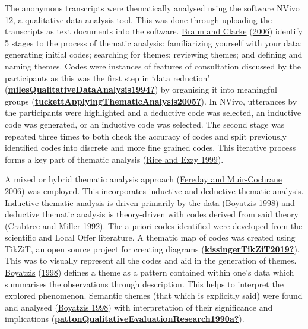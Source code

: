 \documentclass[
]{article}
\begin{document}
The anonymous transcripts were thematically analysed using the software
NVivo 12, a qualitative data analysis tool. This was done through
uploading the transcripts as text documents into the software.
\protect\hyperlink{ref-braunUsingThematicAnalysis2006}{Braun and Clarke}
(\protect\hyperlink{ref-braunUsingThematicAnalysis2006}{2006}) identify
5 stages to the process of thematic analysis: familiarizing yourself
with your data; generating initial codes; searching for themes;
reviewing themes; and defining and naming themes. Codes were instances
of features of consultation discussed by the participants as this was
the first step in `data reduction'
(\protect\hyperlink{ref-milesQualitativeDataAnalysis1994}{\textbf{milesQualitativeDataAnalysis1994?}})
by organising it into meaningful groups
(\protect\hyperlink{ref-tuckettApplyingThematicAnalysis2005}{\textbf{tuckettApplyingThematicAnalysis2005?}}).
In NVivo, utterances by the participants were highlighted and a
deductive code was selected, an inductive code was generated, or an
inductive code was selected. The second stage was repeated three times
to both check the accuracy of codes and split previously identified
codes into discrete and more fine grained codes. This iterative process
forms a key part of thematic analysis
(\protect\hyperlink{ref-riceQualitativeResearchMethods1999}{Rice and
Ezzy 1999}).

A mixed or hybrid thematic analysis approach
(\protect\hyperlink{ref-feredayDemonstratingRigorUsing2006}{Fereday and
Muir-Cochrane 2006}) was employed. This incorporates inductive and
deductive thematic analysis. Inductive thematic analysis is driven
primarily by the data
(\protect\hyperlink{ref-boyatzisTransformingQualitativeInformation1998a}{Boyatzis
1998}) and deductive thematic analysis is theory-driven with codes
derived from said theory
(\protect\hyperlink{ref-crabtreeTemplateApproachText1992}{Crabtree and
Miller 1992}). The a priori codes identified were developed from the
scientific and Local Offer literature. A thematic map of codes was
created using TikZiT, an open source project for creating diagrams
(\protect\hyperlink{ref-kissingerTikZiT2019}{\textbf{kissingerTikZiT2019?}}).
This was to visually represent all the codes and aid in the generation
of themes.
\protect\hyperlink{ref-boyatzisTransformingQualitativeInformation1998a}{Boyatzis}
(\protect\hyperlink{ref-boyatzisTransformingQualitativeInformation1998a}{1998})
defines a theme as a pattern contained within one's data which
summarises the observations through description. This helps to interpret
the explored phenomenon. Semantic themes (that which is explicitly said)
were found and analysed
(\protect\hyperlink{ref-boyatzisTransformingQualitativeInformation1998a}{Boyatzis
1998}) with interpretation of their significance and implications
(\protect\hyperlink{ref-pattonQualitativeEvaluationResearch1990a}{\textbf{pattonQualitativeEvaluationResearch1990a?}}).
\end{document}
